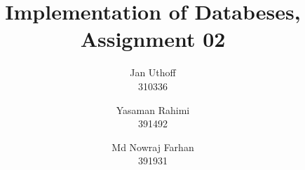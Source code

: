 \documentclass{exercisesheet}
\title{Implementation of Databeses, Assignment 02}
\author{
    Jan Uthoff  \\ 310336
    \and
    Yasaman Rahimi \\ 391492
    \and
    Md Nowraj Farhan \\ 391931
}
\begin{document}
\maketitle

\pointtable


\end{document}
